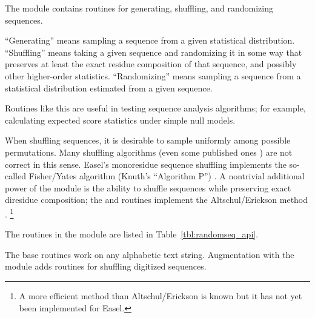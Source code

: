 The  module contains routines for generating,
shuffling, and randomizing sequences.

``Generating'' means sampling a sequence from a given statistical
distribution. ``Shuffling'' means taking a given sequence and
randomizing it in some way that preserves at least the exact residue
composition of that sequence, and possibly other higher-order
statistics. ``Randomizing'' means sampling a sequence from a
statistical distribution estimated from a given sequence.

Routines like this are useful in testing sequence analysis algorithms;
for example, calculating expected score statistics under simple null
models. 


When shuffling sequences, it is desirable to sample uniformly among
possible permutations. Many shuffling algorithms (even some published
ones \citep{Fitch83}) are not correct in this sense. Easel's
monoresidue sequence shuffling implements the so-called Fisher/Yates
algorithm (Knuth's ``Algorithm P'') \citep{Durstenfeld64,Knu-81a}.  A
nontrivial additional power of the module is the ability to shuffle
sequences while preserving exact diresidue composition; the
 and 
routines implement the Altschul/Erickson method
\citep{AltschulErickson86}. \footnote{A more efficient method than
Altschul/Erickson is known \citep{KandelWinkler96,Coward99} but it has
not yet been implemented for Easel.}

The routines in the module are listed in
Table~\ref{tbl:randomseq_api}.

The base routines work on any alphabetic text string.  Augmentation
with the  module adds routines for shuffling
digitized sequences.


